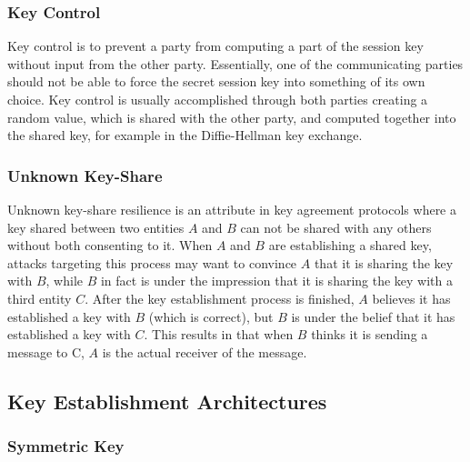

\subsubsection{Key Control}

Key control is to prevent a party from computing a part of the session key without input from the other party. Essentially, one of the communicating parties should not be able to force the secret session key into something of its own choice. Key control is usually accomplished through both parties creating a random value, which is shared with the other party, and computed together into the shared key, for example in the Diffie-Hellman key exchange.

\subsubsection{Unknown Key-Share}

Unknown key-share resilience is an attribute in key agreement protocols where a key shared between two entities $A$ and $B$ can not be shared with any others without both consenting to it. When $A$ and $B$ are establishing a shared key, attacks targeting this process may want to convince $A$ that it is sharing the key with $B$, while $B$ in fact is under the impression that it is sharing the key with a third entity $C$. After the key establishment process is finished, $A$ believes it has established a key with $B$ (which is correct), but $B$ is under the belief that it has established a key with $C$. This results in that when $B$ thinks it is sending a message to C, $A$ is the actual receiver of the message.



\subsection{Key Establishment Architectures}

\subsubsection{Symmetric Key}

